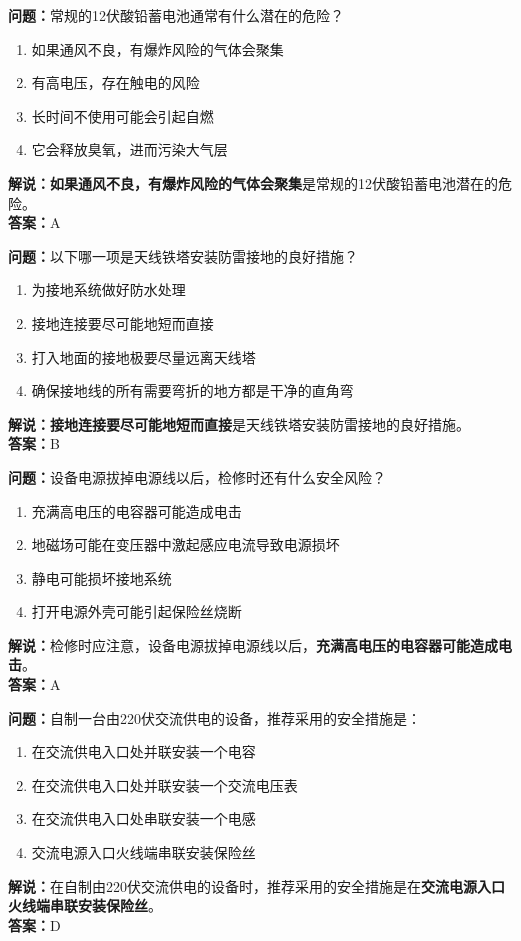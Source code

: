 \bigskip



\noindent\textbf{问题：}常规的12伏酸铅蓄电池通常有什么潜在的危险？
\begin{enumerate}[label=\Alph*), leftmargin=3em]
	\item 如果通风不良，有爆炸风险的气体会聚集
	\item 有高电压，存在触电的风险
	\item 长时间不使用可能会引起自燃
	\item 它会释放臭氧，进而污染大气层
\end{enumerate}
\noindent\textbf{解说：}\textbf{如果通风不良，有爆炸风险的气体会聚集}是常规的12伏酸铅蓄电池潜在的危险。\\\noindent\textbf{答案：}A


\bigskip



\noindent\textbf{问题：}以下哪一项是天线铁塔安装防雷接地的良好措施？
\begin{enumerate}[label=\Alph*), leftmargin=3em]
	\item 为接地系统做好防水处理
	\item 接地连接要尽可能地短而直接
	\item 打入地面的接地极要尽量远离天线塔
	\item 确保接地线的所有需要弯折的地方都是干净的直角弯
\end{enumerate}
\noindent\textbf{解说：}\textbf{接地连接要尽可能地短而直接}是天线铁塔安装防雷接地的良好措施。\\\noindent\textbf{答案：}B


\bigskip



\noindent\textbf{问题：}设备电源拔掉电源线以后，检修时还有什么安全风险？
\begin{enumerate}[label=\Alph*), leftmargin=3em]
	\item 充满高电压的电容器可能造成电击
	\item 地磁场可能在变压器中激起感应电流导致电源损坏
	\item 静电可能损坏接地系统
	\item 打开电源外壳可能引起保险丝烧断
\end{enumerate}
\noindent\textbf{解说：}检修时应注意，设备电源拔掉电源线以后，\textbf{充满高电压的电容器可能造成电击}。\\\noindent\textbf{答案：}A


\bigskip



\noindent\textbf{问题：}自制一台由220伏交流供电的设备，推荐采用的安全措施是：
\begin{enumerate}[label=\Alph*), leftmargin=3em]
	\item 在交流供电入口处并联安装一个电容
	\item 在交流供电入口处并联安装一个交流电压表
	\item 在交流供电入口处串联安装一个电感
	\item 交流电源入口火线端串联安装保险丝
\end{enumerate}
\noindent\textbf{解说：}在自制由220伏交流供电的设备时，推荐采用的安全措施是在\textbf{交流电源入口火线端串联安装保险丝}。\\\noindent\textbf{答案：}D


